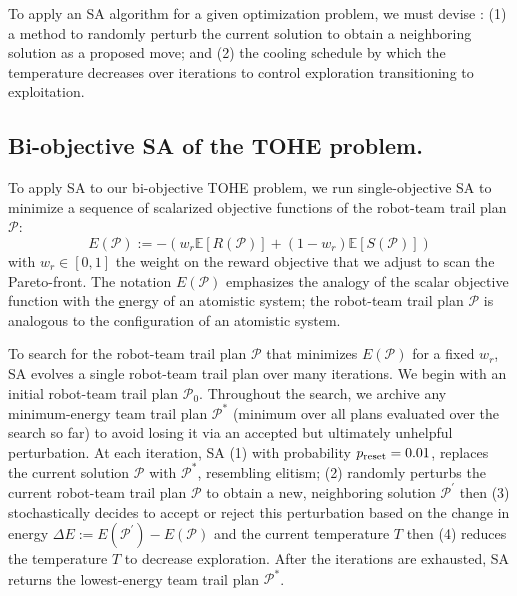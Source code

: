 \documentclass[fleqn,10pt,lineno]{wlpeerj}
\begin{document}
  
  To apply an SA algorithm for a given optimization problem, we must devise \cite{simon2013evolutionary}: 
  (1) a method to randomly perturb the current solution to obtain a neighboring solution as a proposed move; and 
  (2) the cooling schedule by which the temperature decreases over iterations to control exploration transitioning to exploitation.
    
\subsection{Bi-objective SA of the TOHE problem.}
To apply SA to our bi-objective TOHE problem, we run single-objective SA to minimize a sequence of scalarized objective functions of the robot-team trail plan $\mathcal{P}$:
\begin{equation}
	E(\mathcal{P}):= -\left( w_r \mathbb{E}[R(\mathcal{P})] + (1-w_r )\mathbb{E}[S(\mathcal{P})]  \right) \label{eq:energy}
\end{equation} with $w_r \in [0, 1]$ the weight on the reward objective that we adjust to scan the Pareto-front. 
The notation $E(\mathcal{P})$ emphasizes the analogy of the scalar objective function with the \underline{e}nergy of an atomistic system; the robot-team trail plan $\mathcal{P}$ is analogous to the configuration of an atomistic system.

To search for the robot-team trail plan $\mathcal{P}$ that minimizes $E(\mathcal{P})$ for a fixed $w_r$, SA evolves a single robot-team trail plan over many iterations. We begin with an initial robot-team trail plan $\mathcal{P}_0$. Throughout the search, we archive any minimum-energy team trail plan $\mathcal{P}^*$ (minimum over all plans evaluated over the search so far) to avoid losing it via an accepted but ultimately unhelpful perturbation.
At each iteration, SA 
   (1) with probability $p_{\rm reset}=0.01$, replaces the current solution $\mathcal{P}$ with $\mathcal{P}^*$, resembling elitism;
   (2) randomly perturbs the current robot-team trail plan $\mathcal{P}$ to obtain a new, neighboring solution $\mathcal{P}^\prime$ then 
   (3) stochastically decides to accept or reject this perturbation based on the change in energy $\Delta E:= E(\mathcal{P^\prime})- E(\mathcal{P})$ and the current temperature $T$ then   
   (4) reduces the temperature $T$ to decrease exploration. 
After the iterations are exhausted, SA returns the lowest-energy team trail plan $\mathcal{P}^*$.
\end{document}
